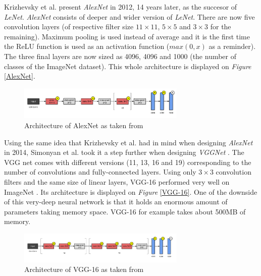 Krizhevsky et al. present \emph{AlexNet} \cite{Krizhevsky2012} in 2012, 14 years later, as the succesor of \emph{LeNet}. \emph{AlexNet} consists of deeper and wider version of \emph{LeNet}. There are now five convolution layers (of respective filter size $11 \times 11$, $5 \times 5$ and $3 \times 3$ for the remaining). Maximum pooling is used instead of average and it is the first time the ReLU function is used as an activation function ($max(0,x)$ as a reminder). The three final layers are now sized as 4096, 4096 and 1000 (the number of classes of the ImageNet \cite{ImageNet2009} dataset). This whole architecture is displayed on \emph{Figure} \ref{AlexNet}.

\begin{figure}[htbp]
	\centering
		\includegraphics[width=8cm]{Figures/AlexNet.png}
	\caption[AlexNet]{Architecture of AlexNet as taken from \cite{Krizhevsky2012}}
	\label{fig:AlexNet}
\end{figure}


Using the same idea that Krizhevsky et al. \cite{Krizhevsky2012} had in mind when designing \emph{AlexNet} in 2014, Simonyan et al. took it a step further when designing \emph{VGGNet} \cite{Simonyan2014}. The VGG net comes with different versions (11, 13, 16 and 19) corresponding to the number of convolutions and fully-connected layers. Using only $3 \times 3$ convolution filters and the same size of linear layers, VGG-16 performed very well on ImageNet \cite{ImageNet2009}. Its architecture is displayed on \emph{Figure} \ref{VGG-16}. One of the downside of this very-deep neural network is that it holds an enormous amount of parameters taking memory space. VGG-16 for example takes about 500MB of memory.

\begin{figure}[htbp]
	\centering
		\includegraphics[width=8cm]{Figures/VGG-16.png}
	\caption[VGG-16]{Architecture of VGG-16 as taken from \cite{Simonyan2014}}
	\label{fig:VGG-16}
\end{figure}

